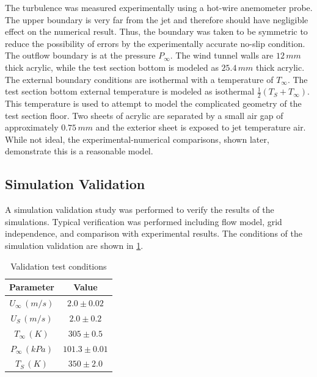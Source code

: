 \documentclass[preprint,12pt]{elsarticle}
\begin{document}
The turbulence was measured experimentally using a hot-wire anemometer probe.  The upper boundary is very far from the jet and therefore should have negligible effect on the numerical result.  Thus, the boundary was taken to be symmetric to reduce the possibility of errors by the experimentally accurate no-slip condition.  The outflow boundary is at the pressure $P_{\infty}$.  The wind tunnel walls are $12\, mm$ thick acrylic, while the test section bottom is modeled as $25.4\,mm$ thick acrylic.  The external boundary conditions are isothermal with a temperature of $T_{\infty}$.  The test section bottom external temperature is modeled as isothermal $\frac{1}{2}\left(T_S+T_{\infty}\right)$.  This temperature is used to attempt to model the complicated geometry of the test section floor.  Two sheets of acrylic are separated by a small air gap of approximately $0.75\,mm$ and the exterior sheet is exposed to jet temperature air.  While not ideal, the experimental-numerical comparisons, shown later, demonstrate this is a reasonable model.

\subsection{Simulation Validation}
A simulation validation study was performed to verify the results of the simulations.  Typical verification was performed including flow model, grid independence, and comparison with experimental results.  The conditions of the simulation validation are shown in \cref{tab:VTjet}.

\begin{table}[!t!b!p]
\begin{center}
\begin{tabular}{ c c }
\hline
Parameter    & Value \\ \hline
$U_{\infty} \, (m/s)$ & $2.0\pm0.02$ \\
$U_S \, (m/s)$ & $2.0\pm0.2$ \\
$T_{\infty} \, (K) $ & $305\pm0.5$ \\
$P_{\infty} \, (kPa) $ & $101.3\pm0.01$ \\
$T_{S} \, (K) $ & $350\pm2.0$ \\ \hline
\end{tabular}
\caption{Validation test conditions}
\label{tab:VTjet}
\end{center}
\end{table}
\end{document}
